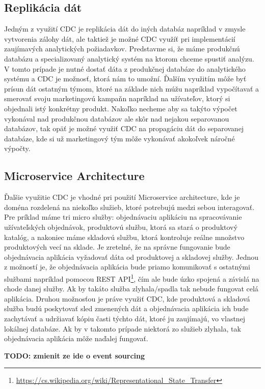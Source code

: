 \subsection{Replikácia dát}
Jedným z využití CDC je replikácia dát do iných databáz napríklad v zmysle vytvorenia zálohy dát, ale taktiež je možné CDC využíť pri implementácií zaujímavých analytických požiadavkov. Predstavme si, že máme produkčnú databázu a specializovaný analytický systém na ktorom chceme spustiť analýzu. V tomto prípade je nutné dostať dáta z produkčnej databáze do analytického systému a CDC je možnosť, ktorá nám to umožní. Ďalším využitím môže byť prísun dát ostatným týmom, ktoré na základe nich múžu napríklad vypočítavať a smerovať svoju marketingovú kampaňn napríklad na užívateľov, ktorý si objednali istý konkrétny produkt. Nakoľko necheme aby sa takýto výpočet vykonával nad produkčnou databázov ale skôr nad nejakou separovanou databázov, tak opäť je možné využiť CDC na propagáciu dát do separovanej databáze, kde si už marketingový tým môže vykonávať akokoľvek náročné výpočty.

\subsection{Microservice Architecture}
Ďalšie využitie CDC je vhodné pri použití Microservice architecture, kde je doména rozdelená na niekoľko služieb, ktoré potrebujú medzi sebou interagovať. Pre príklad máme tri micro služby: objednávaciu aplikáciu na spracovávanie užívateľských objednávok, produktovú službu, ktorá sa stará o produktový katalóg, a nakoniec máme skladovú službu, ktorá kontroluje reálne množstvo produktových vecí na sklade. Je zretelné, že na správne fungovanie bude objednávacia aplikácia vyžadovať dáta od produktovej a skladovej služby. Jednou z možností je, že objednávacia aplikácia bude priamo komunikovať s ostatnými službami napríklad pomocou REST API\footnote{\url{https://cs.wikipedia.org/wiki/Representational_State_Transfer}}, čím ale bude úzko spojená a závislá na chode danej služby. Ak by takáto služba zlyhala/spadla tak nebude fungovat celá aplikácia. Druhou možnosťou je práve využiť CDC, kde produktová a skladová služba budú poskytovať sled zmenených dát a objednávacia aplikácia ich bude zachytávať a udržiavať kópiu časti týchto dát, ktoré ju zaujímajú, vo vlastnej lokálnej databáze. Ak by v takomto prípade niektorá zo služieb zlyhala, tak objednávacia aplikácia môže naďalej fungovať.

\textbf{TODO: zmienit ze ide o event sourcing}


